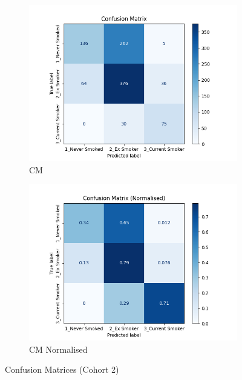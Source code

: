 \documentclass{article}
\begin{document}
\begin{figure}
    \begin{subfigure}{0.49\textwidth}
        \centering
        \includegraphics[width=\linewidth]{cohort2_cm.png}
        \caption{CM}
    \end{subfigure}
    \hfill
    \begin{subfigure}{0.49\textwidth}
        \centering
        \includegraphics[width=\linewidth]{cohort2_cm_n.png}
        \caption{CM Normalised}
    \end{subfigure}
    \caption{Confusion Matrices (Cohort 2)}
\end{figure}
\end{document}

